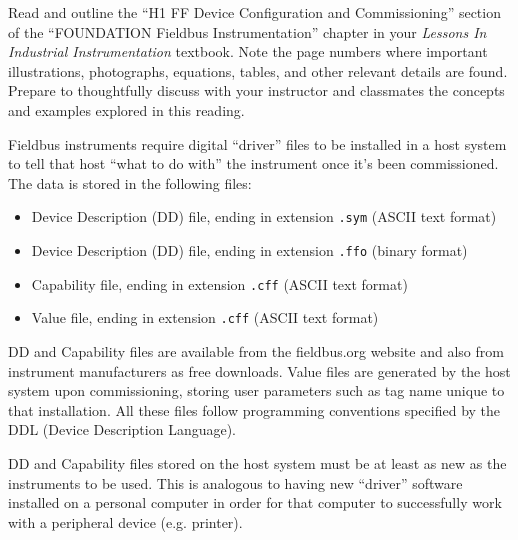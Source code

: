 

Read and outline the ``H1 FF Device Configuration and Commissioning'' section of the ``FOUNDATION Fieldbus Instrumentation'' chapter in your {\it Lessons In Industrial Instrumentation} textbook.  Note the page numbers where important illustrations, photographs, equations, tables, and other relevant details are found.  Prepare to thoughtfully discuss with your instructor and classmates the concepts and examples explored in this reading.














Fieldbus instruments require digital ``driver'' files to be installed in a host system to tell that host ``what to do with'' the instrument once it's been commissioned.  The data is stored in the following files:

\begin{itemize}
\item{} Device Description (DD) file, ending in extension {\tt .sym} (ASCII text format)
\item{} Device Description (DD) file, ending in extension {\tt .ffo} (binary format)
\item{} Capability file, ending in extension {\tt .cff} (ASCII text format)
\item{} Value file, ending in extension {\tt .cff} (ASCII text format)
\end{itemize}

DD and Capability files are available from the fieldbus.org website and also from instrument manufacturers as free downloads.  Value files are generated by the host system upon commissioning, storing user parameters such as tag name unique to that installation.  All these files follow programming conventions specified by the DDL (Device Description Language).

DD and Capability files stored on the host system must be at least as new as the instruments to be used.  This is analogous to having new ``driver'' software installed on a personal computer in order for that computer to successfully work with a peripheral device (e.g. printer).

